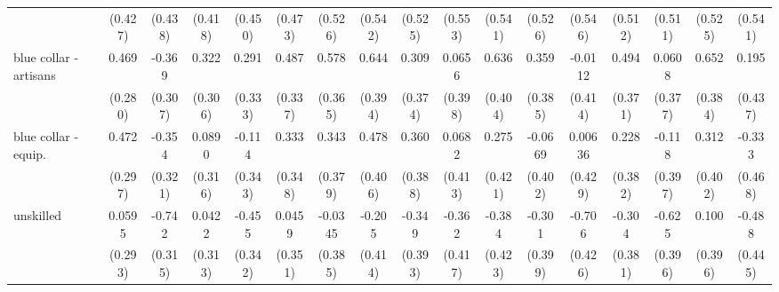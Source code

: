 {\begin{tabular}{l*{16}{c}}
                    &     (0.427)         &     (0.438)         &     (0.418)         &     (0.450)         &     (0.473)         &     (0.526)         &     (0.542)         &     (0.525)         &     (0.553)         &     (0.541)         &     (0.526)         &     (0.546)         &     (0.512)         &     (0.511)         &     (0.525)         &     (0.541)         \\
[1em]
blue collar - artisans&       0.469         &      -0.369         &       0.322         &       0.291         &       0.487         &       0.578         &       0.644         &       0.309         &      0.0656         &       0.636         &       0.359         &     -0.0112         &       0.494         &      0.0608         &       0.652         &       0.195         \\
                    &     (0.280)         &     (0.307)         &     (0.306)         &     (0.333)         &     (0.337)         &     (0.365)         &     (0.394)         &     (0.374)         &     (0.398)         &     (0.404)         &     (0.385)         &     (0.414)         &     (0.371)         &     (0.377)         &     (0.384)         &     (0.437)         \\
[1em]
blue collar - equip.&       0.472         &      -0.354         &      0.0890         &      -0.114         &       0.333         &       0.343         &       0.478         &       0.360         &      0.0682         &       0.275         &     -0.0669         &     0.00636         &       0.228         &      -0.118         &       0.312         &      -0.333         \\
                    &     (0.297)         &     (0.321)         &     (0.316)         &     (0.343)         &     (0.348)         &     (0.379)         &     (0.406)         &     (0.388)         &     (0.413)         &     (0.421)         &     (0.402)         &     (0.429)         &     (0.382)         &     (0.397)         &     (0.402)         &     (0.468)         \\
[1em]
unskilled           &      0.0595         &      -0.742\sym{*}  &      0.0422         &      -0.455         &      0.0459         &     -0.0345         &      -0.205         &      -0.349         &      -0.362         &      -0.384         &      -0.301         &      -0.706         &      -0.304         &      -0.625         &       0.100         &      -0.488         \\
                    &     (0.293)         &     (0.315)         &     (0.313)         &     (0.342)         &     (0.351)         &     (0.385)         &     (0.414)         &     (0.393)         &     (0.417)         &     (0.423)         &     (0.399)         &     (0.426)         &     (0.381)         &     (0.396)         &     (0.396)         &     (0.445)         \\

\end{tabular}}
